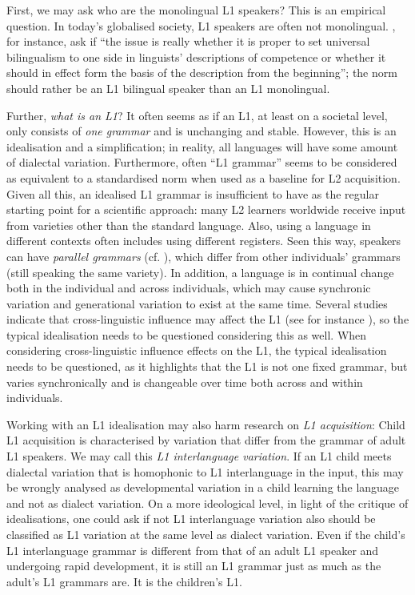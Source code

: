\documentclass[output=paper,colorlinks,citecolor=brown,modfonts,nonflat]{../langscibook}
\begin{document}
First, we may ask who are the monolingual L1 speakers? This is an empirical question. In today’s globalised society, L1 speakers are often not monolingual. \citet[6]{CookNewson2007}, for instance, ask if “the issue is really whether it is proper to set universal bilingualism to one side in linguists’ descriptions of competence or whether it should in effect form the basis of the description from the beginning”; the norm should rather be an L1 bilingual speaker than an L1 monolingual.

Further, \textit{what is an L1}? It often seems as if an L1, at least on a societal level, only consists of \textit{one grammar} and is unchanging and stable. However, this is an idealisation and a simplification; in reality, all languages will have some amount of dialectal variation. Furthermore, often ``L1 grammar'' seems to be considered as equivalent to a standardised norm when used as a baseline for L2 acquisition. Given all this, an idealised L1 grammar is insufficient to have as the regular starting point for a scientific approach: many L2 learners worldwide receive input from varieties other than the standard language. Also, using a language in different contexts often includes using different registers. Seen this way, speakers can have \textit{parallel grammars} (cf. \citealt{EideSollid2011}), which differ from other individuals’ grammars (still speaking the same variety). In addition, a language is in continual change both in the individual and across individuals, which may cause synchronic variation and generational variation to exist at the same time. Several studies indicate that cross-linguistic influence may affect the L1 (see for instance \citealt{CookNewson2007}), so the typical idealisation needs to be questioned considering this as well. When considering cross-linguistic influence effects on the L1, the typical idealisation needs to be questioned, as it highlights that the L1 is not one fixed grammar, but varies synchronically and is changeable over time both across and within individuals.

Working with an L1 idealisation may also harm research on \textit{L1 acquisition}: Child L1 acquisition is characterised by variation that differ from the grammar of adult L1 speakers. We may call this \textit{L1 interlanguage variation}. If an L1 child meets dialectal variation that is homophonic to L1 interlanguage in the input, this may be wrongly analysed as developmental variation in a child learning the language and not as dialect variation. On a more ideological level, in light of the critique of idealisations, one could ask if not L1 interlanguage variation also should be classified as L1 variation at the same level as dialect variation. Even if the child’s L1 interlanguage grammar is different from that of an adult L1 speaker and undergoing rapid development, it is still an L1 grammar just as much as the adult’s L1 grammars are. It is the children’s L1.
\end{document}
